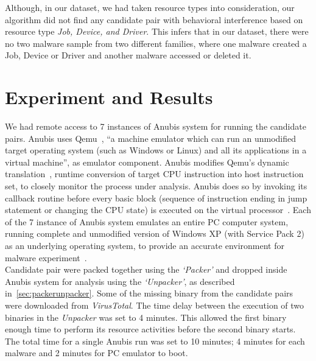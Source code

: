 Although, in our dataset, we had taken resource types {\getresourcetypes{}} into consideration, our algorithm did not find any candidate pair with behavioral interference based on resource type \emph{Job, Device, and Driver}.
This infers that in our dataset, there were no two malware sample from two different families, where one malware created a Job, Device or Driver and another malware accessed or deleted it.
\section{Experiment and Results}
\label{sec:Experiment and Results}
We had remote access to 7 instances of Anubis system for running the candidate pairs.
Anubis uses Qemu~\cite[]{qemu}, ``a machine emulator which can run an unmodified target operating system (such as Windows or Linux) and all its applications in a virtual machine'', as emulator component.
Anubis modifies Qemu's dynamic translation~\cite[]{qemu}, runtime conversion of target CPU instruction into host instruction set, to closely monitor the process under analysis.
Anubis does so by invoking its callback routine before every basic block (sequence of instruction ending in jump statement or changing the CPU state) is executed on the virtual processor~\cite[]{ttanalyze}.
Each of the 7 instance of Anubis system emulates an entire PC computer system, running complete and unmodified version of Windows XP (with Service Pack 2) as an underlying operating system, to provide an accurate environment for malware experiment~\cite[]{ttanalyze}.
\\

Candidate pair were packed together using the \emph{`Packer'} and dropped inside Anubis system for analysis using the \emph{`Unpacker'}, as described in~\ref{sec:packerunpacker}.
Some of the missing binary from the candidate pairs were downloaded from \emph{VirusTotal}.
The time delay between the execution of two binaries in the \emph{Unpacker} was set to 4 minutes.
This allowed the first binary enough time to perform its resource activities before the second binary starts.
The total time for a single Anubis run was set to 10 minutes; 4 minutes for each malware and 2 minutes for PC emulator to boot.\\

